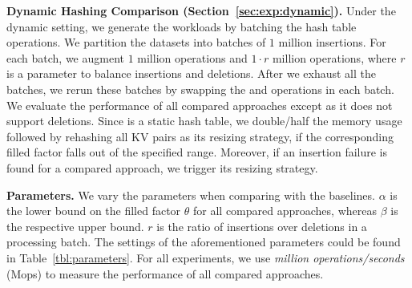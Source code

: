 

\vspace{1mm}\noindent\textbf{Dynamic Hashing Comparison (Section~\ref{sec:exp:dynamic}).}
Under the dynamic setting, we generate the workloads by batching the hash table operations. 
We partition the datasets into batches of $1$ million insertions. 
For each batch, we augment $1$ million  operations and $1 \cdot r$ million  operations,
where $r$ is a parameter to balance insertions and deletions.
After we exhaust all the batches, we rerun these batches by swapping the  and  operations in each batch. 
We evaluate the performance of all compared approaches except \cudpp as it does not support deletions. 
Since \megakv is a static hash table, we double/half the memory usage followed by rehashing all KV pairs as its resizing strategy, if the corresponding filled factor falls out of the specified range. 
Moreover, if an insertion failure is found for a compared approach, we trigger its resizing strategy.



\vspace{1mm}\noindent\textbf{Parameters.}
We vary the parameters when comparing \voter with the baselines.
$\alpha$ is the lower bound on the filled factor $\theta$ for all compared approaches,
whereas $\beta$ is the respective upper bound.
$r$ is the ratio of insertions over deletions in a processing batch. 
The settings of the aforementioned parameters could be found in Table~\ref{tbl:parameters}. For all experiments, we use \emph{million operations/seconds} (Mops) to measure the performance of all compared approaches.

